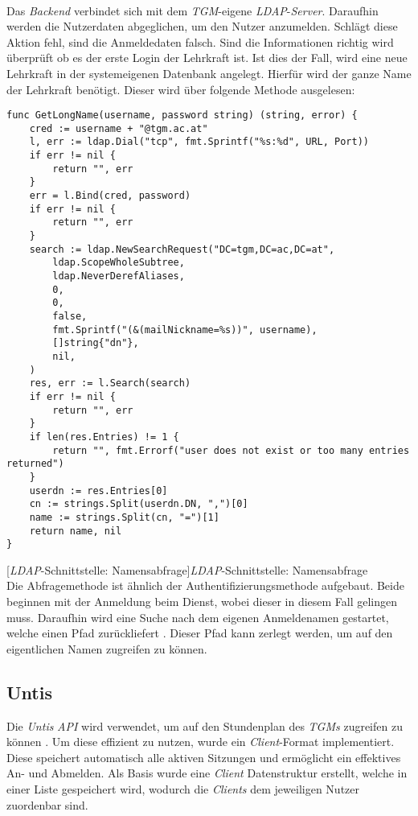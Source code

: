 ~\\
Das \textit{Backend} verbindet sich mit dem \textit{TGM}-eigene \textit{LDAP}-\textit{Server}. Daraufhin werden die Nutzerdaten abgeglichen, um den Nutzer anzumelden. Schlägt diese Aktion fehl, sind die Anmeldedaten falsch. Sind die Informationen richtig wird überprüft ob es der erste Login der Lehrkraft ist. Ist dies der Fall, wird eine neue Lehrkraft in der systemeigenen Datenbank angelegt. Hierfür wird der ganze Name der Lehrkraft benötigt. Dieser wird über folgende Methode ausgelesen:

\newpage

\begin{verbatim}
func GetLongName(username, password string) (string, error) {
	cred := username + "@tgm.ac.at"
	l, err := ldap.Dial("tcp", fmt.Sprintf("%s:%d", URL, Port))
	if err != nil {
		return "", err
	}
	err = l.Bind(cred, password)
	if err != nil {
		return "", err
	}
	search := ldap.NewSearchRequest("DC=tgm,DC=ac,DC=at",
		ldap.ScopeWholeSubtree,
		ldap.NeverDerefAliases,
		0,
		0,
		false,
		fmt.Sprintf("(&(mailNickname=%s))", username),
		[]string{"dn"},
		nil,
	)
	res, err := l.Search(search)
	if err != nil {
		return "", err
	}
	if len(res.Entries) != 1 {
		return "", fmt.Errorf("user does not exist or too many entries returned")
	}
	userdn := res.Entries[0]
	cn := strings.Split(userdn.DN, ",")[0]
	name := strings.Split(cn, "=")[1]
	return name, nil
}
\end{verbatim}
[\textit{LDAP}-Schnittstelle: Namensabfrage]{\textit{LDAP}-Schnittstelle: Namensabfrage \cite{go-ldap}}
~\\
Die Abfragemethode ist ähnlich der Authentifizierungsmethode aufgebaut. Beide beginnen mit der Anmeldung beim Dienst, wobei dieser in diesem Fall gelingen muss. Daraufhin wird eine Suche nach dem eigenen Anmeldenamen gestartet, welche einen Pfad zurückliefert \cite{go-ldap}. Dieser Pfad kann zerlegt werden, um auf den eigentlichen Namen zugreifen zu können.

\newpage

\subsection{Untis}

Die \textit{Untis} \textit{API} wird verwendet, um auf den Stundenplan des \textit{TGMs} zugreifen zu können \cite{untis}. Um diese effizient zu nutzen, wurde ein \textit{Client}-Format implementiert. Diese speichert automatisch alle aktiven Sitzungen und ermöglicht ein effektives An- und Abmelden. Als Basis wurde eine \textit{Client} Datenstruktur erstellt, welche in einer Liste gespeichert wird, wodurch die \textit{Clients} dem jeweiligen Nutzer zuordenbar sind.

